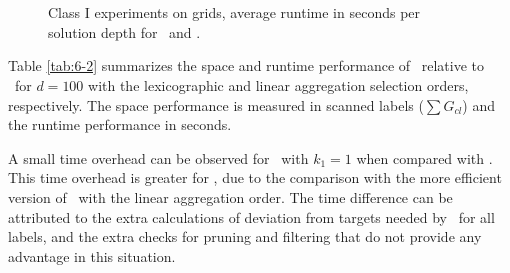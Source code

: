\begin{figure}
    \begin{center}
%
      \\ %
\vspace{0.025\textwidth}      
\\ %
    \end{center}
    \vspace{-0.25in} 
    \caption{%
Class I experiments on grids, average runtime in seconds per solution depth for \namoa \ and \lexgo.  
    }%
    \label{fig:6-3}
\end{figure}

Table \ref{tab:6-2} summarizes the space and runtime performance of \lexgo \ relative to \namoa \ for $d = 100$ with the lexicographic and linear aggregation selection orders, respectively. The space performance is measured in scanned labels ($\sum G_{cl}$) and the runtime performance in seconds. 

A small time overhead can be observed for \lexgolex \ with $k_1= 1$ when compared with \namoalex. This time overhead is greater for \lexgolin, due to the comparison with the more efficient version of \namoa \ with the linear aggregation order. The time difference can be attributed to the extra calculations of deviation from targets needed by \lexgo \ for all labels, and the extra checks for pruning and filtering that do not provide any advantage in this situation.

